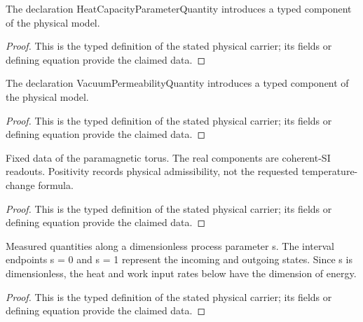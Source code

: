 \begin{definition}
  \label{def:physics:IPhO_2026_3_B_2:aux015}
  The declaration HeatCapacityParameterQuantity introduces a typed component of the physical model.
\end{definition}
\begin{proof}
  This is the typed definition of the stated physical carrier; its fields or defining equation provide the claimed data.
\end{proof}

\begin{definition}
  \label{def:physics:IPhO_2026_3_B_2:aux016}
  The declaration VacuumPermeabilityQuantity introduces a typed component of the physical model.
\end{definition}
\begin{proof}
  This is the typed definition of the stated physical carrier; its fields or defining equation provide the claimed data.
\end{proof}

\begin{definition}
  \label{def:physics:IPhO_2026_3_B_2:aux017}
  Fixed data of the paramagnetic torus. The real components are coherent-SI readouts. Positivity records physical admissibility, not the requested temperature-change formula.
\end{definition}
\begin{proof}
  This is the typed definition of the stated physical carrier; its fields or defining equation provide the claimed data.
\end{proof}

\begin{definition}
  \label{def:physics:IPhO_2026_3_B_2:aux018}
  Measured quantities along a dimensionless process parameter s. The interval endpoints s = 0 and s = 1 represent the incoming and outgoing states. Since s is dimensionless, the heat and work input rates below have the dimension of energy.
\end{definition}
\begin{proof}
  This is the typed definition of the stated physical carrier; its fields or defining equation provide the claimed data.
\end{proof}

